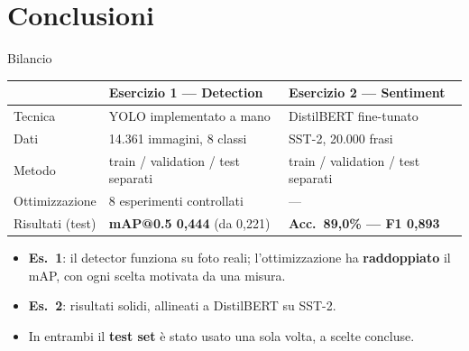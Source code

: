 \documentclass[aspectratio=169]{beamer}
\begin{document}
\section{Conclusioni}

\begin{frame}{Bilancio}
  \begin{center}
  \begin{tabular}{lll}
    \toprule
     & Esercizio 1 --- Detection & Esercizio 2 --- Sentiment \\
    \midrule
    Tecnica & YOLO implementato a mano & DistilBERT fine-tunato \\
    Dati & 14.361 immagini, 8 classi & SST-2, 20.000 frasi \\
    Metodo & train / validation / test separati & train / validation / test separati \\
    Ottimizzazione & 8 esperimenti controllati & --- \\
    Risultati (test) & \textbf{mAP@0.5 0,444} (da 0,221) & \textbf{Acc.\ 89,0\% --- F1 0,893} \\
    \bottomrule
  \end{tabular}
  \end{center}
  \vspace{0.3cm}
  \begin{itemize}
    \item \textbf{Es.\ 1}: il detector funziona su foto reali; l'ottimizzazione ha
          \textbf{raddoppiato} il mAP, con ogni scelta motivata da una misura.
    \item \textbf{Es.\ 2}: risultati solidi, allineati a DistilBERT su SST-2.
    \item In entrambi il \textbf{test set} è stato usato una sola volta, a scelte concluse.
  \end{itemize}
\end{frame}
\end{document}
